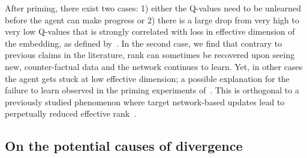 After priming, there exist two cases: 1) either the Q-values need to be unlearned before the agent can make progress or 2) there is a large drop from very high to very low Q-values that is strongly correlated with loss in effective dimension of the embedding, as defined by~\cite{yang2020harnessing}. In the second case, we find that contrary to previous claims in the literature, rank can sometimes be recovered upon seeing new, counter-factual data and the network continues to learn. Yet, in other cases the agent gets stuck at low effective dimension; a possible explanation for the failure to learn observed in the priming experiments of~\textcite{nikishin2022primacy}. This is orthogonal to a previously studied phenomenon where target network-based updates lead to perpetually reduced effective rank~\parencite{kumar2021implicit}.


\subsection{On the potential causes of divergence} \label{sec:causes}

